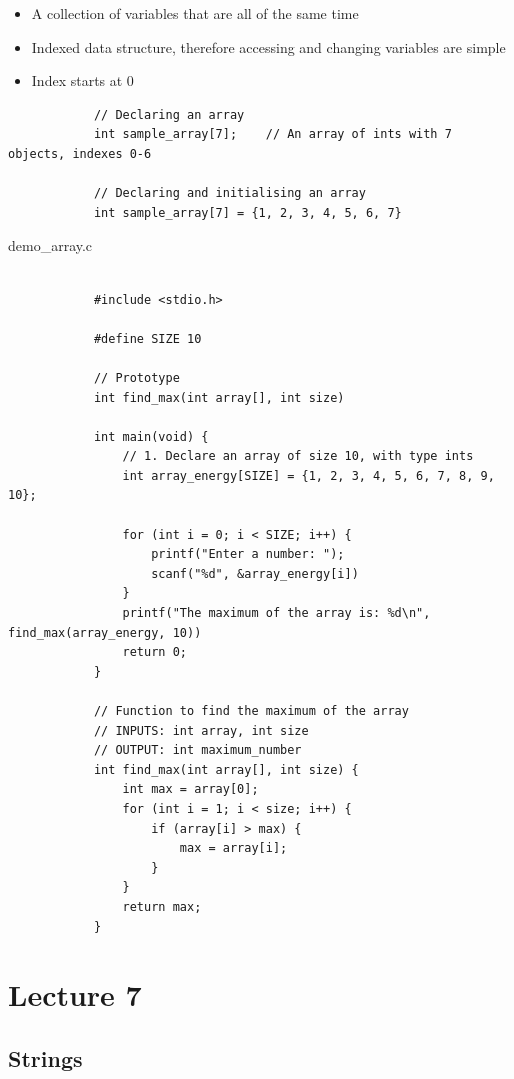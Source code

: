 \documentclass{article}
\begin{document}
		\begin{itemize}
			\item A collection of variables that are all of the same time
			\item Indexed data structure, therefore accessing and changing variables are simple
			\item Index starts at 0
		\end{itemize}

		\begin{verbatim}
			// Declaring an array
			int sample_array[7];	// An array of ints with 7 objects, indexes 0-6
			
			// Declaring and initialising an array
			int sample_array[7] = {1, 2, 3, 4, 5, 6, 7}
		\end{verbatim}

		\begin{question}{demo\_array.c}
			\begin{verbatim}
				
			#include <stdio.h>

			#define SIZE 10

			// Prototype
			int find_max(int array[], int size)

			int main(void) {
				// 1. Declare an array of size 10, with type ints
				int array_energy[SIZE] = {1, 2, 3, 4, 5, 6, 7, 8, 9, 10};

				for (int i = 0; i < SIZE; i++) {
					printf("Enter a number: ");
					scanf("%d", &array_energy[i])
				}
				printf("The maximum of the array is: %d\n", find_max(array_energy, 10))
				return 0;
			}

			// Function to find the maximum of the array
			// INPUTS: int array, int size
			// OUTPUT: int maximum_number
			int find_max(int array[], int size) {
				int max = array[0];
				for (int i = 1; i < size; i++) {
					if (array[i] > max) {
						max = array[i];
					}
				}
				return max;
			}

			\end{verbatim}
		\end{question}

\newpage

\section{Lecture 7}

	\subsection{Strings}
\end{document}
